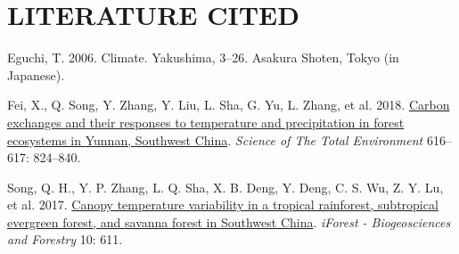 \documentclass[
  12pt,
  a4paper,
,tablecaptionabove
]{scrartcl}
\newlength{\cslhangindent}
\newenvironment{CSLReferences}[2] %
 {%
  \setlength{\parindent}{0pt}
  \ifodd #1 \everypar{\setlength{\hangindent}{\cslhangindent}}\ignorespaces\fi
  \ifnum #2 > 0
  \setlength{\parskip}{#2\baselineskip}
  \fi
 }%
 {}
\begin{document}
\newpage

\hypertarget{literature-cited}{%
\section*{LITERATURE CITED}\label{literature-cited}}

\hypertarget{refs}{}
\begin{CSLReferences}{1}{0}
\leavevmode{}%
Eguchi, T. 2006. Climate. Yakushima, 3--26. {Asakura Shoten}, {Tokyo (in
Japanese)}.

\leavevmode{}%
Fei, X., Q. Song, Y. Zhang, Y. Liu, L. Sha, G. Yu, L. Zhang, et al.
2018. \href{https://doi.org/10.1016/j.scitotenv.2017.10.239}{Carbon
exchanges and their responses to temperature and precipitation in forest
ecosystems in {Yunnan}, {Southwest China}}. \emph{Science of The Total
Environment} 616--617: 824--840.

\leavevmode{}%
Song, Q. H., Y. P. Zhang, L. Q. Sha, X. B. Deng, Y. Deng, C. S. Wu, Z.
Y. Lu, et al. 2017. \href{https://doi.org/10.3832/ifor2223-010}{Canopy
temperature variability in a tropical rainforest, subtropical evergreen
forest, and savanna forest in {Southwest China}}. \emph{iForest -
Biogeosciences and Forestry} 10: 611.

\end{CSLReferences}
\end{document}

